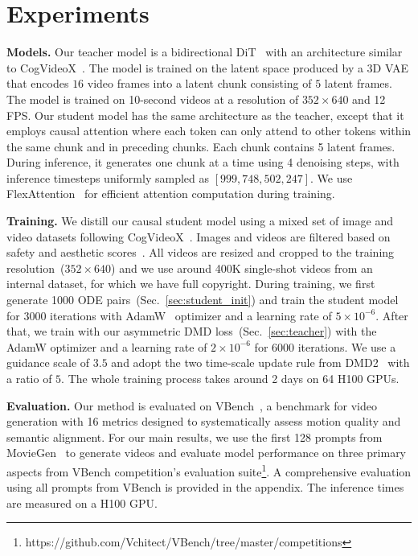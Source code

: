 \section{Experiments}
\label{sec:experiments}

\noindent\textbf{Models.}
Our teacher model is a bidirectional DiT~\cite{peebles2023scalable} with an architecture similar to CogVideoX~\cite{yang2024cogvideox}. The model is trained on the latent space produced by a 3D VAE that encodes $16$ video frames into a latent chunk consisting of $5$ latent frames. The model is trained on 10-second videos at a resolution of $352\times640$ and 12 FPS.
Our student model has the same architecture as the teacher, except that it employs causal attention where each token can only attend to other tokens within the same chunk and in preceding chunks.
Each chunk contains 5 latent frames. 
During inference, it generates one chunk at a time using 4 denoising steps, with inference timesteps uniformly sampled as $[999,748,502,247]$.
We use FlexAttention~\cite{he2024flexattention} for efficient attention computation during training.

\vspace{0.5em}
\noindent\textbf{Training.}
We distill our causal student model using a mixed set of image and video datasets following CogVideoX~\cite{yang2024cogvideox}.
Images and videos are filtered based on safety and aesthetic scores~\cite{schuhmann2022laion}.
All videos are resized and cropped to the training resolution~($352\times640$) and we use around 400K single-shot videos from an internal dataset, for which we have full copyright. 
During training, we first generate 1000 ODE pairs~(Sec.~\ref{sec:student_init}) and train the student model for $3000$ iterations with AdamW~\cite{loshchilov2017decoupled} optimizer and a learning rate of $5\times 10^{-6}$.
After that, we train with our asymmetric DMD loss~(Sec.~\ref{sec:teacher}) with the AdamW optimizer and a learning rate of $2\times 10^{-6}$ for $6000$ iterations.
We use a guidance scale of $3.5$ and adopt the two time-scale update rule from DMD2~\cite{yin2024improved} with a ratio of $5$.
The whole training process takes around 2 days on 64 H100 GPUs.

\vspace{0.5em}
\noindent\textbf{Evaluation.}
Our method is evaluated on VBench~\cite{huang2024vbench}, a benchmark for video generation with 16 metrics designed to systematically assess motion quality and semantic alignment.
For our main results, we use the first 128 prompts from MovieGen~\cite{polyak2024movie} to generate videos and evaluate model performance on three primary aspects from VBench competition’s evaluation suite\footnote{https://github.com/Vchitect/VBench/tree/master/competitions}. 
A comprehensive evaluation using all prompts from VBench is provided in the appendix.
The inference times are measured on a H100 GPU. 




